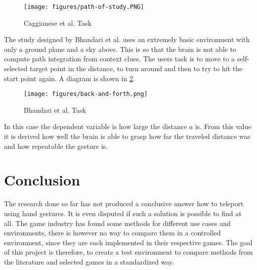 \begin{figure}[hbt!]
  \centering
  \texttt{[image: figures/path-of-study.PNG]}
  \caption{Caggianese et al. \cite{Caggianese} Task}
  \label{fig:path}
\end{figure}


The study designed by Bhandari et al. \cite{Bhandari} uses an extremely basic environment with only a ground plane and a sky above. This is so that the brain is not able to compute path integration from context clues. The users task is to move to a self-selected target point in the distance, to turn around and then to try to hit the start point again. A diagram is shown in \ref{fig:backAndForth}.

\begin{figure}[hbt!]
  \centering
  \texttt{[image: figures/back-and-forth.png]}
  \caption{Bhandari et al. \cite{Bhandari} Task}
  \label{fig:backAndForth}
\end{figure}

In this case the dependent variable is how large the distance $a$ is. From this value it is derived how well the brain is able to grasp how far the traveled distance was and how repeatable the gesture is.

\section{Conclusion}
The research done so far has not produced a conclusive answer how to teleport using hand gestures. It is even disputed if such a solution is possible to find at all. The game industry has found some methods for different use cases and environments, there is however no way to compare them in a controlled environment, since they are each implemented in their respective games. The goal of this project is therefore, to create a test environment to compare methods from the literature and selected games in a standardized way. 
